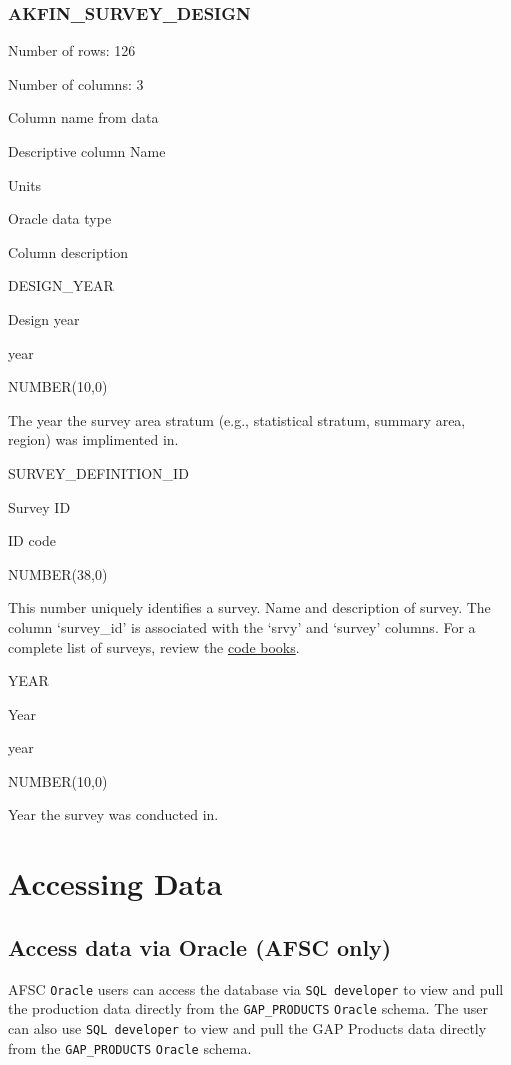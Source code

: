 \documentclass[
  letterpaper,
  oneside,
  open=any]{scrbook}
\begin{document}
\hypertarget{akfin_survey_design}{%
\subsection{AKFIN\_SURVEY\_DESIGN}\label{akfin_survey_design}}

Number of rows: 126

Number of columns: 3

Column name from data

Descriptive column Name

Units

Oracle data type

Column description

DESIGN\_YEAR

Design year

year

NUMBER(10,0)

The year the survey area stratum (e.g., statistical stratum, summary
area, region) was implimented in.

SURVEY\_DEFINITION\_ID

Survey ID

ID code

NUMBER(38,0)

This number uniquely identifies a survey. Name and description of
survey. The column `survey\_id' is associated with the `srvy' and
`survey' columns. For a complete list of surveys, review the
\href{https://www.fisheries.noaa.gov/resource/document/groundfish-survey-species-code-manual-and-data-codes-manual}{code
books}.

YEAR

Year

year

NUMBER(10,0)

Year the survey was conducted in.

\hypertarget{accessing-data}{%
\chapter{Accessing Data}\label{accessing-data}}

\hypertarget{access-data-via-oracle-afsc-only}{%
\section{Access data via Oracle (AFSC
only)}\label{access-data-via-oracle-afsc-only}}

AFSC \texttt{Oracle} users can access the database via
\texttt{SQL\ developer} to view and pull the production data directly
from the \texttt{GAP\_PRODUCTS} \texttt{Oracle} schema. The user can
also use \texttt{SQL\ developer} to view and pull the GAP Products data
directly from the \texttt{GAP\_PRODUCTS} \texttt{Oracle} schema.
\end{document}
